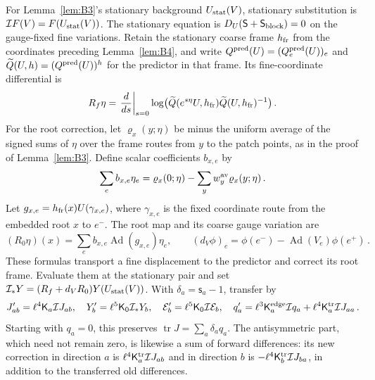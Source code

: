 For Lemma~\ref{lem:B3}'s stationary background $U_{\rm stat}(V)$, stationary substitution is $\mathcal IF(V)=F(U_{\rm stat}(V))$. The stationary equation is $D_U(\mathsf S+\mathsf S_{\rm block})=0$ on the gauge-fixed fine variations. Retain the stationary coarse frame $h_{\rm fr}$ from the coordinates preceding Lemma~\ref{lem:B4}, and write $Q^{\rm pred}(U)=(Q_e^{\rm pred}(U))_e$ and $\widetilde Q(U,h)=(Q^{\rm pred}(U))^h$ for the predictor in that frame. Its fine-coordinate differential is
\begin{equation*}
R_f\eta=\left.\frac{d}{ds}\right|_{s=0}
\log\bigl(\widetilde Q(e^{s\eta}U,h_{\rm fr})\widetilde Q(U,h_{\rm fr})^{-1}\bigr)\,.
\end{equation*}
For the root correction, let $\varrho_x(y;\eta)$ be minus the uniform average of the signed sums of $\eta$ over the frame routes from $y$ to the patch points, as in the proof of Lemma~\ref{lem:B3}. Define scalar coefficients $b_{x,e}$ by
\begin{equation*}
\sum_e b_{x,e}\eta_e=\varrho_x(0;\eta)-\sum_yw_y^{\rm av}\varrho_x(y;\eta)\,.
\end{equation*}
Let $g_{x,e}=h_{\rm fr}(x)U(\gamma_{x,e})$, where $\gamma_{x,e}$ is the fixed coordinate route from the embedded root $x$ to $e^-$. The root map and its coarse gauge variation are
\begin{equation*}
(R_0\eta)(x)=\sum_e b_{x,e}\operatorname{Ad}(g_{x,e})\eta_e,
\qquad (d_V\phi)_e=\phi(e^-)-\operatorname{Ad}(V_e)\phi(e^+)\,.
\end{equation*}
These formulas transport a fine displacement to the predictor and correct its root frame. Evaluate them at the stationary pair and set $\mathcal I_*Y=(R_f+d_VR_0)Y(U_{\rm stat}(V))$. With $\delta_a=\mathsf s_a-1$, transfer by
\begin{equation}\label{eq:I-transfer-map}
J'_{ab}=\ell^4\mathsf K_a\mathcal IJ_{ab},\quad Y'_b=\ell^5\mathsf K_0\mathcal I_*Y_b,\quad
\mathcal E'_b=\ell^5\mathsf K_0\mathcal I\mathcal E_b,\quad
q'_a=\ell^3\mathsf K_a^{\rm edge}\mathcal Iq_a+\ell^4\mathsf K_a^{\rm tr}\mathcal IJ_{aa}\,.
\end{equation}
Starting with $q_a=0$, this preserves $\operatorname{tr}J=\sum_a\delta_aq_a$. The antisymmetric part, which need not remain zero, is likewise a sum of forward differences: its new correction in direction $a$ is $\ell^4\mathsf K_a^{\rm tr}\mathcal IJ_{ab}$ and in direction $b$ is $-\ell^4\mathsf K_b^{\rm tr}\mathcal IJ_{ba}$, in addition to the transferred old differences.

